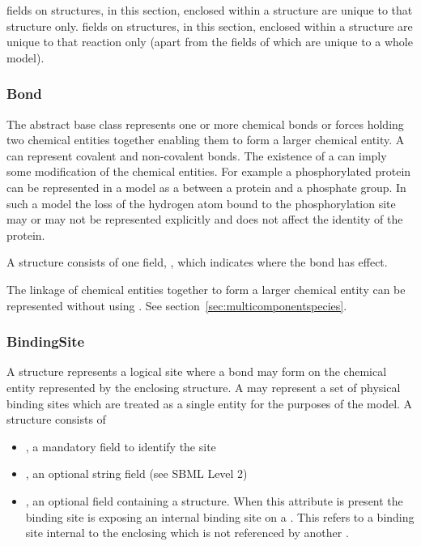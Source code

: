 \documentclass{cekarticle}
\begin{document}
 fields on structures, in this section, enclosed within
a  structure are unique to that structure only.
 fields on structures, in this section, enclosed within
a  structure are unique to that reaction only
(apart from the  fields of
 which are unique to a whole
model).

\subsubsection{Bond}

The abstract base class  represents one or more chemical bonds or forces holding two chemical
entities together enabling them to form a larger chemical entity.  A  can represent
covalent and non-covalent bonds.  The existence of a  can imply some
modification of the chemical entities.  For example a phosphorylated protein can be represented
in a model as a  between a protein and a phosphate group.  In such a model
the loss of the hydrogen atom bound to the phosphorylation site may or may not be represented
explicitly and does not affect the identity of the protein.

A  structure consists of one  field,
, which indicates where the bond has effect.

The linkage of chemical entities together to form a larger chemical entity can be
represented without using .  See section~\ref{sec:multicomponentspecies}.

\subsubsection{BindingSite}

A  structure represents a logical site where a
bond may form on the chemical entity represented by the enclosing
 structure. A  may represent
a set of physical binding sites which are treated as a single
entity for the purposes of the model. A 
structure consists of

\begin{itemize}

\item {}, a mandatory  field to identify the site

\item {}, an optional string field (see SBML Level 2)

\item {}, an optional field containing
a  structure.  When this attribute is
present the binding site is exposing an internal binding site on a
. This 
refers to a binding site internal to the enclosing
 which is not referenced by another
.

\end{itemize}
\end{document}

